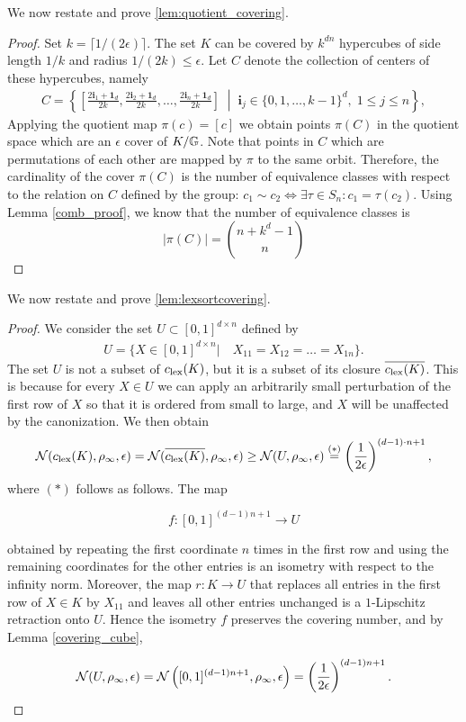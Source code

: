 \documentclass{article}
\begin{document}
We now restate and prove \ref{lem:quotient_covering}.
\quotientcovering*
\begin{proof}
Set $k=\lceil 1/(2\epsilon) \rceil$. The set $K$ can be covered by $k^{dn}$ hypercubes of side length $1/k$ and radius $1/(2k)\leq \epsilon$. Let $C$ denote the collection of centers of these hypercubes, namely
\begin{align*}
C=
\left\{
\left[
\frac{2\mathbf{i}_1+\mathbf{1}_d}{2k},
\frac{2\mathbf{i}_2+\mathbf{1}_d}{2k},
\ldots,
\frac{2\mathbf{i}_n+\mathbf{1}_d}{2k}
\right]
\;\middle|\;
\mathbf{i}_j\in\{0,1,\ldots,k-1\}^d,\;
1\leq j\leq n
\right\},
\end{align*}
Applying the quotient map  $\pi(c) = [c]$ we obtain points $\pi(C)$ in the quotient space which are an $\epsilon$ cover of $K/\mathbb{G}$. Note that points in $C$ which are permutations of each other are mapped by $\pi$ to the same orbit. Therefore, the cardinality of the cover $\pi(C)$ is the number of equivalence classes with respect to the relation on $C$ defined by the group:  $c_1 \sim c_2 \iff \exists \tau \in S_n : c_1 = \tau(c_2)$. Using Lemma \ref{comb_proof}, we know that the number of equivalence classes is \begin{equation*}
|\pi(C)|=    \binom{n+k^d-1}{n}
\end{equation*} 
\end{proof}
We now restate and prove \ref{lem:lexsortcovering}.
\lexsortcovering*
\begin{proof}
    \label{lexsortcovering}
    We consider the set $U \subset [0,1]^{ d \times n}$ defined by 
\begin{align*}
    U= \{X\in [0,1]^{d\times n}| \quad X_{11}=X_{12}=\ldots=X_{1n}\}.
\end{align*}
The set $U$ is not a subset of $c_{\mathrm{lex}}(K)$, but it is a subset of its closure $\overline{c_{\mathrm{lex}}(K)}$. This is because for every $X \in U$ we can apply an arbitrarily small perturbation of the first row of $X$ so that it is ordered from small to large, and $X$ will be unaffected by the canonization. We then obtain
\[
\mathcal{N}(c_{\mathrm{lex}}(K),\rho_\infty,\epsilon)
=
\mathcal{N}(\overline{c_{\mathrm{lex}}(K)},\rho_\infty,\epsilon)
\geq
\mathcal{N}(U,\rho_\infty,\epsilon)
\stackrel{(*)}{=}
\left(\frac{1}{2\epsilon}\right)^{(d-1)\cdot n + 1},
\]
where $(*)$ follows as follows. The map

$$
f:[0,1]^{(d-1)n+1}\to U
$$

obtained by repeating the first coordinate $n$ times in the first row and using the remaining coordinates for the other entries is an isometry with respect to the infinity norm. Moreover, the map $r:K\to U$ that replaces all entries in the first row of $X\in K$ by $X_{11}$ and leaves all other entries unchanged is a $1$-Lipschitz retraction onto $U$. Hence the isometry $f$ preserves the covering number, and by Lemma \ref{covering_cube},

$$
\mathcal{N}(U,\rho_\infty,\epsilon)
=
\mathcal{N}\left([0,1]^{(d-1)n+1},\rho_\infty,\epsilon\right)
=
\left(\frac{1}{2\epsilon}\right)^{(d-1)n+1}.
$$

\end{proof}
\end{document}
